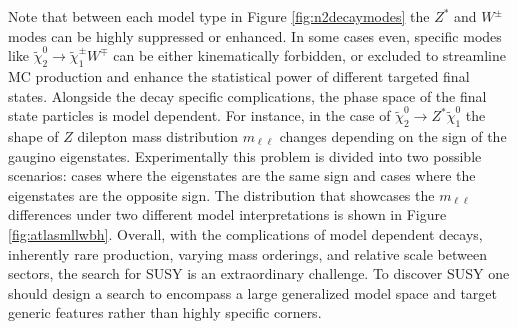 Note that between each model type in Figure \ref{fig:n2decaymodes} the $Z^*$ and $W^\pm$ modes can be highly suppressed or enhanced. In some cases even, specific modes like $\tilde{\chi}^0_2\rightarrow \tilde{\chi}_1^\pm W^\mp$ can be either kinematically forbidden, or excluded to streamline MC production and enhance the statistical power of different targeted final states. Alongside the decay specific complications, the phase space of the final state particles is model dependent. For instance, in the case of $\tilde{\chi}^0_2 \rightarrow Z^*\tilde{\chi}^0_1 $ the shape of $Z$ dilepton mass distribution $m_{\ell\ell}$  changes depending on the sign of the gaugino eigenstates. Experimentally this problem is divided into two possible scenarios: cases where the eigenstates are the same sign and cases where the eigenstates are the opposite sign. The distribution that showcases the $m_{\ell\ell}$ differences under two different model interpretations is shown in Figure \ref{fig:atlasmllwbh}. Overall, with the complications of model dependent decays, inherently rare production, varying mass orderings, and relative scale between sectors, the search for SUSY is an extraordinary challenge. To discover SUSY one should design a search to encompass a large generalized model space and target generic features rather than highly specific corners. 






